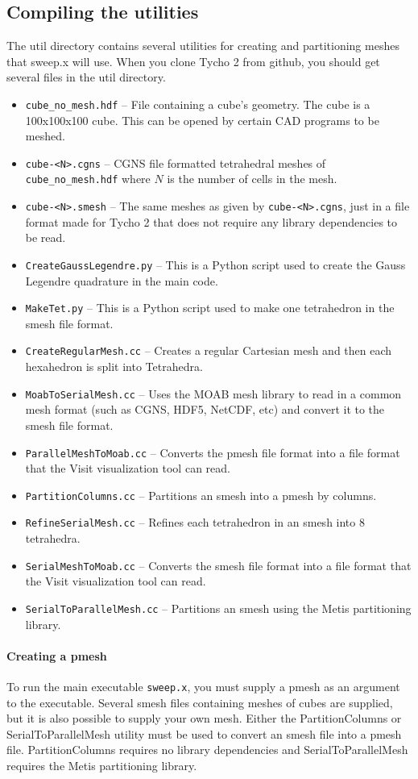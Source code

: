 \documentclass[12pt,letterpaper]{article}
\begin{document}
\subsection{Compiling the utilities}
The util directory contains several utilities for creating and partitioning meshes that sweep.x will use.
When you clone Tycho 2 from github, you should get several files in the util directory.
\begin{itemize}
\item {\tt cube\_no\_mesh.hdf} -- File containing a cube's geometry.  The cube is a 100x100x100 cube.  This can be opened by certain CAD programs to be meshed.
\item {\tt cube-<N>.cgns} -- CGNS file formatted tetrahedral meshes of {\tt cube\_no\_mesh.hdf} where $N$ is the number of cells in the mesh.
\item {\tt cube-<N>.smesh} -- The same meshes as given by {\tt cube-<N>.cgns}, just in a file format made for Tycho 2 that does not require any library dependencies to be read.
\item {\tt CreateGaussLegendre.py} -- This is a Python script used to create the Gauss Legendre quadrature in the main code.
\item {\tt MakeTet.py} -- This is a Python script used to make one tetrahedron in the smesh file format.
\item {\tt CreateRegularMesh.cc} -- Creates a regular Cartesian mesh and then each hexahedron is split into Tetrahedra.
\item {\tt MoabToSerialMesh.cc} -- Uses the MOAB mesh library to read in a common mesh format (such as CGNS, HDF5, NetCDF, etc) and convert it to the smesh file format.
\item {\tt ParallelMeshToMoab.cc} -- Converts the pmesh file format into a file format that the Visit visualization tool can read.
\item {\tt PartitionColumns.cc} -- Partitions an smesh into a pmesh by columns.
\item {\tt RefineSerialMesh.cc} -- Refines each tetrahedron in an smesh into 8 tetrahedra.
\item {\tt SerialMeshToMoab.cc} -- Converts the smesh file format into a file format that the Visit visualization tool can read.
\item {\tt SerialToParallelMesh.cc} -- Partitions an smesh using the Metis partitioning library.
\end{itemize}

\paragraph{Creating a pmesh}
To run the main executable {\tt sweep.x}, you must supply a pmesh as an argument to the executable.
Several smesh files containing meshes of cubes are supplied, but it is also possible to supply your own mesh.
Either the PartitionColumns or SerialToParallelMesh utility must be used to convert an smesh file into a pmesh file.
PartitionColumns requires no library dependencies and SerialToParallelMesh requires the Metis partitioning library.
\end{document}
